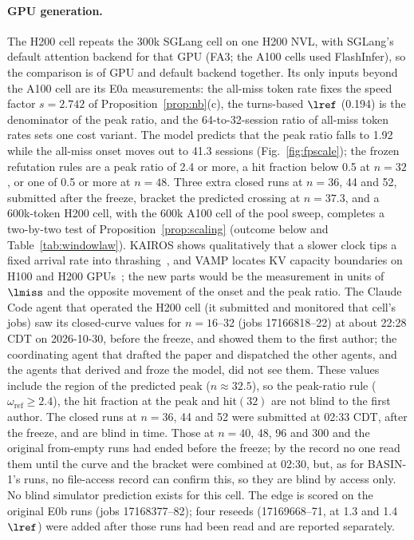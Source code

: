 \paragraph{GPU generation.} The H200 cell repeats the 300k SGLang cell on one H200 NVL, with SGLang's default attention backend for that GPU (FA3; the A100 cells used FlashInfer), so the comparison is of GPU and default backend together. Its only inputs beyond the A100 cell are its E0a measurements: the all-miss token rate fixes the speed factor $s=2.742$ of Proposition~\ref{prop:nb}(c), the turns-based $\lref$ (0.194\sps) is the denominator of the peak ratio, and the 64-to-32-session ratio of all-miss token rates sets one cost variant. The model predicts that the peak ratio falls to 1.92 while the all-miss onset moves out to 41.3 sessions (Fig.~\ref{fig:fpscale}); the frozen refutation rules are a peak ratio of 2.4 or more, a hit fraction below 0.5 at $n=32$, or one of 0.5 or more at $n=48$. Three extra closed runs at $n=36$, 44 and 52, submitted after the freeze, bracket the predicted crossing at $n=37.3$, and a 600k-token H200 cell, with the 600k A100 cell of the pool sweep, completes a two-by-two test of Proposition~\ref{prop:scaling} (outcome below and Table~\ref{tab:windowlaw}). KAIROS shows qualitatively that a slower clock tips a fixed arrival rate into thrashing~\citep{yuan2026kairos}, and VAMP locates KV capacity boundaries on H100 and H200 GPUs~\citep{kim2026vamp}; the new parts would be the measurement in units of $\lmiss$ and the opposite movement of the onset and the peak ratio. The Claude Code agent that operated the H200 cell (it submitted and monitored that cell's jobs) saw its closed-curve values for $n=16$--32 (jobs 17166818--22) at about 22:28 CDT on 2026-10-30, before the freeze, and showed them to the first author; the coordinating agent that drafted the paper and dispatched the other agents, and the agents that derived and froze the model, did not see them. These values include the region of the predicted peak ($n\approx32.5$), so the peak-ratio rule ($\omega_{\mathrm{ref}}\ge2.4$), the hit fraction at the peak and hit$(32)$ are not blind to the first author. The closed runs at $n=36$, 44 and 52 were submitted at 02:33 CDT, after the freeze, and are blind in time. Those at $n=40$, 48, 96 and 300 and the original from-empty runs had ended before the freeze; by the record no one read them until the curve and the bracket were combined at 02:30, but, as for BASIN-1's runs, no file-access record can confirm this, so they are blind by access only. No blind simulator prediction exists for this cell. The edge is scored on the original E0b runs (jobs 17168377--82); four reseeds (17169668--71, at 1.3 and 1.4 $\lref$) were added after those runs had been read and are reported separately.

